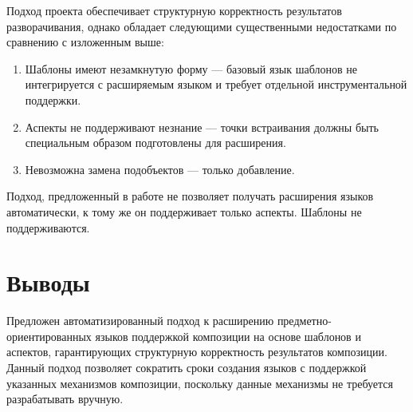 Подход проекта  \cite{???} обеспечивает структурную корректность результатов разворачивания, однако обладает следующими существенными недостатками по сравнению с изложенным выше:
\begin{enumerate}
\item Шаблоны имеют незамкнутую форму --- базовый язык шаблонов не интегрируется с расширяемым языком и требует отдельной инструментальной поддержки.
\item Аспекты не поддерживают незнание --- точки встраивания должны быть специальным образом подготовлены для расширения.
\item Невозможна замена подобъектов --- только добавление. 
\end{enumerate}

Подход, предложенный в работе \cite{VanWyk} не позволяет получать расширения языков автоматически, к тому же он поддерживает только аспекты. Шаблоны не поддерживаются.

\chapter{Выводы}

Предложен автоматизированный подход к расширению предметно-ориентированных языков поддержкой композиции на основе шаблонов и аспектов, гарантирующих структурную корректность результатов композиции. Данный подход позволяет сократить сроки создания языков с поддержкой указанных механизмов композиции, поскольку данные механизмы не требуется разрабатывать вручную.